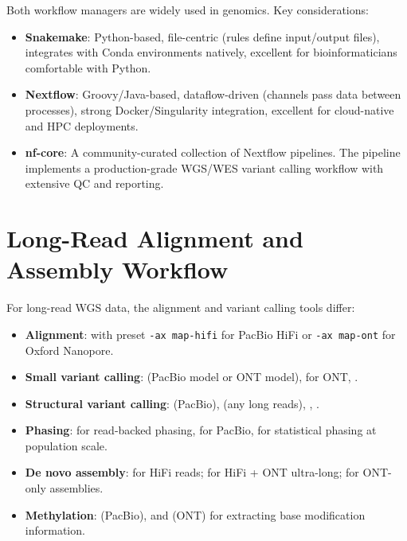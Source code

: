 \begin{tipbox}[title={Choosing Between Snakemake and Nextflow}]
Both workflow managers are widely used in genomics. Key considerations:
\begin{itemize}[nosep]
  \item \textbf{Snakemake}: Python-based, file-centric (rules define input/output files), integrates with Conda environments natively, excellent for bioinformaticians comfortable with Python.
  \item \textbf{Nextflow}: Groovy/Java-based, dataflow-driven (channels pass data between processes), strong Docker/Singularity integration, excellent for cloud-native and HPC deployments.
  \item \textbf{nf-core}: A community-curated collection of Nextflow pipelines. The  pipeline implements a production-grade WGS/WES variant calling workflow with extensive QC and reporting.
\end{itemize}
\end{tipbox}

\section{Long-Read Alignment and Assembly Workflow}
\label{sec:longread_workflow}

For long-read WGS data, the alignment and variant calling tools differ:

\begin{itemize}[nosep]
  \item \textbf{Alignment}:  with preset \texttt{-ax map-hifi} for PacBio HiFi or \texttt{-ax map-ont} for Oxford Nanopore.
  \item \textbf{Small variant calling}:  (PacBio model or ONT model),  for ONT, .
  \item \textbf{Structural variant calling}:  (PacBio),  (any long reads), , .
  \item \textbf{Phasing}:  for read-backed phasing,  for PacBio,  for statistical phasing at population scale.
  \item \textbf{De novo assembly}:  for HiFi reads;  for HiFi + ONT ultra-long;  for ONT-only assemblies.
  \item \textbf{Methylation}:  (PacBio),  and  (ONT) for extracting base modification information.
\end{itemize}

